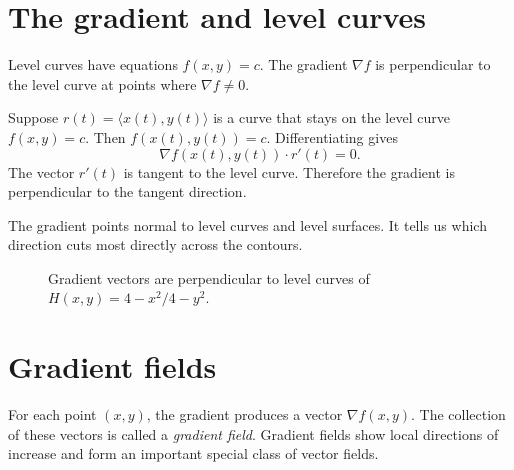 \documentclass[11pt]{article}
\newcommand{\grad}{\nabla}
\begin{document}
\section{The gradient and level curves}

Level curves have equations $f(x,y)=c$. The gradient $\grad f$ is perpendicular to the level curve at points where $\grad f\ne 0$.

Suppose $r(t)=\langle x(t),y(t)\rangle$ is a curve that stays on the level curve $f(x,y)=c$. Then $f(x(t),y(t))=c$. Differentiating gives
\[
\grad f(x(t),y(t))\cdot r'(t)=0.
\]
The vector $r'(t)$ is tangent to the level curve. Therefore the gradient is perpendicular to the tangent direction.

\begin{importantbox}
The gradient points normal to level curves and level surfaces. It tells us which direction cuts most directly across the contours.
\end{importantbox}

\begin{figure}[H]
\centering
{}
\caption{Gradient vectors are perpendicular to level curves of $H(x,y)=4-x^2/4-y^2$.}
\end{figure}

\section{Gradient fields}

For each point $(x,y)$, the gradient produces a vector $\grad f(x,y)$. The collection of these vectors is called a \emph{gradient field}. Gradient fields show local directions of increase and form an important special class of vector fields.
\end{document}
